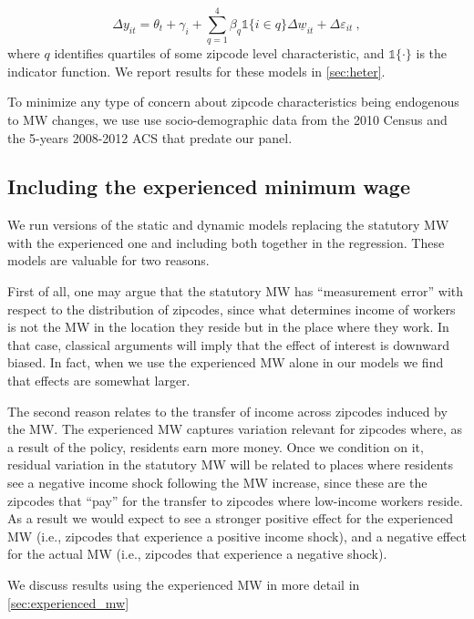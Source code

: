 \begin{equation}\label{eq:diff_main_hetero} 
    \Delta y_{it} = \theta_t + \gamma_i 
    		+ \sum_{q = 1}^4 \beta_q \mathds{1}\{i \in q\} \Delta \underline{w}_{it} 
    		+ \Delta \varepsilon_{it} \ ,
\end{equation}
where $q$ identifies quartiles of some zipcode level characteristic, and $\mathds{1}\{ \cdot \}$ 
is the indicator function. We report results for these models in \autoref{sec:heter}.

To minimize any type of concern about zipcode characteristics being endogenous to MW changes, 
we use use socio-demographic data from the 2010 Census and the 5-years 2008-2012 ACS that 
predate our panel.


\subsection{Including the experienced minimum wage}

We run versions of the static and dynamic models replacing the statutory MW with the 
experienced one and including both together in the regression. These models are valuable 
for two reasons.

First of all, one may argue that the statutory MW has ``measurement error'' with respect 
to the distribution of zipcodes, since what determines income of workers is not the MW
in the location they reside but in the place where they work. In that case, classical
arguments will imply that the effect of interest is downward biased. In fact, when we 
use the experienced MW alone in our models we find that effects are somewhat larger.

The second reason relates to the transfer of income across zipcodes induced by the MW.
The experienced MW captures variation relevant for zipcodes where, as a result of the 
policy, residents earn more money. Once we condition on it, residual variation in the
statutory MW will be related to places where residents see a negative income shock
following the MW increase, since these are the zipcodes that ``pay'' for the transfer
to zipcodes where low-income workers reside. As a result we would expect to see
a stronger positive effect for the experienced MW (i.e., zipcodes that experience a 
positive income shock), and a negative effect for the actual MW (i.e., zipcodes that 
experience a negative shock).

We discuss results using the experienced MW in more detail in \autoref{sec:experienced_mw}




